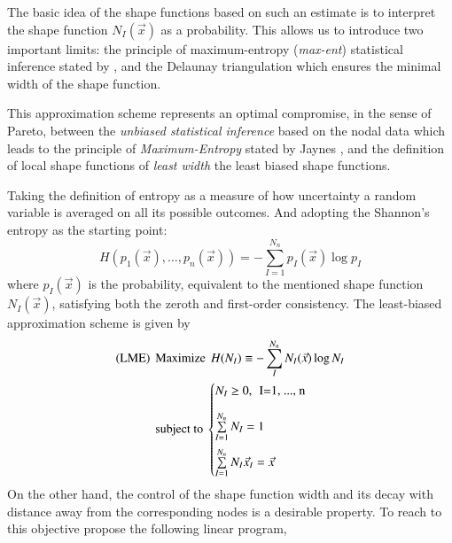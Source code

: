 \documentclass[preprint,12pt,a4paper]{elsarticle}
\begin{document}
The basic idea of the shape functions based on such an estimate is to interpret the shape function $N_I(\vec{x})$ as a probability. This allows us to introduce two important limits:
the principle of maximum-entropy (\textit{max-ent}) statistical
inference stated by \cite{Jaynes1957}, and the Delaunay triangulation
which ensures the minimal width of the shape function. 

This approximation scheme represents an optimal compromise, in the sense of
Pareto, between the \textit{unbiased statistical inference} based on
the nodal data which leads to the principle of \textit{Maximum-Entropy}
stated by Jaynes \cite{Jaynes1957}, and the definition of local shape
functions of \textit{least width} the least biased shape functions.

Taking the definition of entropy as a measure of how uncertainty a
random variable is averaged on all its possible outcomes. And adopting
the Shannon's entropy as the starting point:
\begin{equation}
  \label{eq:Shannon-entropy}
  H(p_1(\vec{x}),\ldots,p_n(\vec{x})) = -\sum^{N_n}_{I=1}{p_I(\vec{x})\log p_I }
\end{equation}
where $p_I(\vec{x})$ is the probability, equivalent to the mentioned
shape function $N_I(\vec{x})$, satisfying both the zeroth and
first-order consistency. The least-biased approximation scheme is
given by
\begin{align*}
  \label{eq:least-biased-approximation-scheme}
  \text{(LME)} \hspace{0.15cm} &\text{Maximize} \hspace{0.15cm} H(N_I) \equiv
  -\sum_{I}^{N_n}{N_I(\vec{x})\log N_I }\\
  &\text{subject to}\
  \begin{cases}
    N_I \ge 0, \hspace{0.15cm} \text{I=1, ..., n} \\[1em]   
    \sum\limits_{I=1}^{N_n}{N_I} = 1 \\[1em]   
    \sum\limits_{I=1}^{N_n}{N_I \vec{x}_I} = \vec{x} \\
  \end{cases}
\end{align*}
On the other hand, the control of the shape function width and its
decay with distance away from the corresponding nodes is a desirable property. To reach to this objective \cite{Arroyo2006} propose the following linear program,
\end{document}
